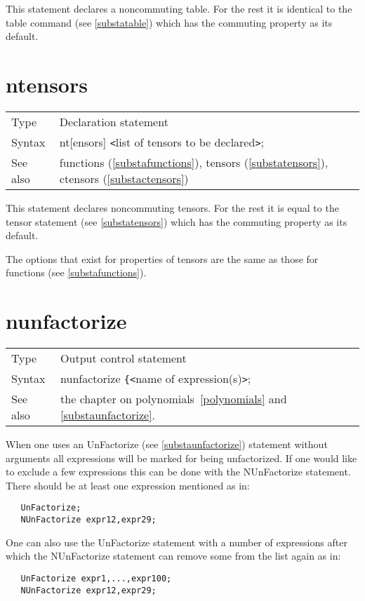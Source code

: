 \noindent This statement declares a 
noncommuting table. For the 
rest it is identical to the table command (see 
\ref{substatable}) which has the commuting property as its default. 
\vspace{10mm}

 
\section{ntensors}
\label{substantensors}

\noindent \begin{tabular}{ll}
Type & Declaration statement\\
Syntax & nt[ensors] {\tt<}list of tensors to be declared{\tt>}; \\
See also & functions (\ref{substafunctions}), tensors 
            (\ref{substatensors}), ctensors (\ref{substactensors})
\end{tabular} \vspace{4mm}

\noindent This statement declares 
noncommuting tensors. For 
the rest it is equal to the tensor statement (see 
\ref{substatensors}) which has the commuting property as its default.

\noindent The options that exist for properties of tensors are the same as 
those for functions (see \ref{substafunctions}). \vspace{10mm}


\section{nunfactorize}
\label{substanunfactorize}

\noindent \begin{tabular}{ll}
Type & Output control statement\\
Syntax & nunfactorize \verb:{:{\tt<}name of expression(s){\tt>};
\\ See also & the chapter on polynomials~\ref{polynomials} and 
\ref{substaunfactorize}.
\end{tabular} \vspace{4mm}

\noindent When one uses an UnFactorize (see \ref{substaunfactorize}) 
statement without arguments all expressions will be marked for being 
unfactorized. If one would like to exclude a few expressions this can be 
done with the NUnFactorize statement. There should be at least one expression 
mentioned as in:
\begin{verbatim}
   UnFactorize;
   NUnFactorize expr12,expr29;
\end{verbatim}
One can also use the UnFactorize statement with a number of expressions after 
which the NUnFactorize statement can remove some from the list again as in:
\begin{verbatim}
   UnFactorize expr1,...,expr100;
   NUnFactorize expr12,expr29;
\end{verbatim}

